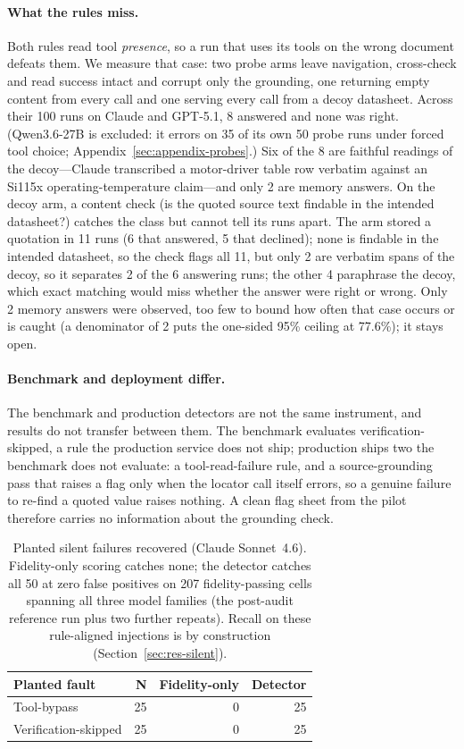 \documentclass[11pt]{article}
\begin{document}
\paragraph{What the rules miss.}
Both rules read tool \emph{presence}, so a run that uses its tools on
the wrong document defeats them. We measure that case: two probe arms leave navigation, cross-check and read
success intact and corrupt only the grounding, one returning empty
content from every call and one serving every call from a decoy
datasheet. Across their 100 runs on Claude and GPT-5.1, 8 answered and
none was right. (Qwen3.6-27B is excluded: it errors on 35 of its own 50
probe runs under forced tool choice;
Appendix~\ref{sec:appendix-probes}.) Six of the 8 are faithful readings
of the decoy---Claude transcribed a motor-driver table row verbatim
against an Si115x operating-temperature claim---and only 2 are memory
answers. On the decoy arm, a content check (is the quoted
source text findable in the intended datasheet?) catches the class but
cannot tell its runs apart. The arm stored a quotation in 11 runs (6
that answered, 5 that declined); none is findable in the intended
datasheet, so the check flags all 11, but only 2 are verbatim spans of
the decoy, so it separates 2 of the 6 answering runs; the other 4
paraphrase the decoy, which exact matching would miss whether the
answer were right or wrong. Only 2 memory answers were observed, too
few to bound how often that case occurs or is caught (a denominator of
2 puts the one-sided 95\% ceiling at 77.6\%); it stays open.

\paragraph{Benchmark and deployment differ.}
The benchmark and production detectors are not the same instrument,
and results do not transfer between them. The benchmark evaluates verification-skipped, a rule the
production service does not ship; production ships two the benchmark
does not evaluate: a tool-read-failure rule, and a source-grounding pass
that raises a flag only when the locator call itself errors, so a
genuine failure to re-find a quoted value raises nothing. A clean flag
sheet from the pilot therefore carries no information about the
grounding check.

\begin{table}[t]
\centering
\small
\begin{tabular}{@{}lrrr@{}}
\toprule
\textbf{Planted fault} & \textbf{N} & \textbf{Fidelity-only} & \textbf{Detector} \\
\midrule
Tool-bypass          & 25 & 0 & 25 \\
Verification-skipped & 25 & 0 & 25 \\
\bottomrule
\end{tabular}
\caption{Planted silent failures recovered (Claude Sonnet~4.6).
Fidelity-only scoring catches none; the detector catches all 50 at zero
false positives on 207 fidelity-passing cells spanning all three model
families (the post-audit reference run plus two further repeats). Recall
on
these rule-aligned injections is by construction
(Section~\ref{sec:res-silent}).}
\label{tab:silent}
\end{table}
\end{document}
